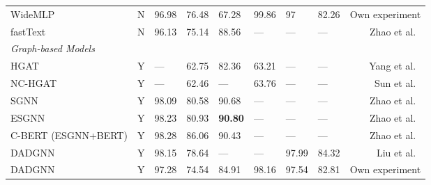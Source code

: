 \documentclass[runningheads]{llncs}
\begin{document}
\begin{table*}[!ht]
\begin{threeparttable}
{\begin{tabular}{lcllllllr}
            WideMLP                                 & N                   & 96.98            & 76.48          & 67.28                             & 99.86            & 97            & 82.26          & Own experiment                  \\
            fastText                                & N                   & 96.13            & 75.14          & 88.56\tnote{$4$}          & ---              & ---           & ---            & Zhao et al.~\cite{zhao2021sequential}      \\
            \midrule
            \textit{Graph-based Models} \\
            HGAT\tnote{$2$}                         & Y                   & ---              & 62.75          & 82.36                             & 63.21            & ---           & ---            & Yang et al.~\cite{hgat}                    \\
            NC-HGAT\tnote{$2$}                      & Y                   & ---              & 62.46          & ---                               & 63.76            & ---           & ---            & Sun et al.~\cite{nc-hgat}                 \\
            SGNN\tnote{$3$}                         & Y                   & 98.09            & 80.58          & 90.68\tnote{$4$}                  & ---              & ---           & ---            & Zhao et al.~\cite{zhao2021sequential}      \\
            ESGNN\tnote{$3$}                        & Y                   & 98.23            & 80.93          & \textbf{90.80}\tnote{$4$}         & ---              & ---           & ---            & Zhao et al.~\cite{zhao2021sequential}      \\
            C-BERT (ESGNN+BERT)\tnote{$3$}        & Y                   & 98.28            & 86.06          & 90.43\tnote{$4$}                  & ---              & ---           & ---            & Zhao et al.~\cite{zhao2021sequential}      \\
            DADGNN                                  & Y                   & 98.15            & 78.64          & ---                               & ---              & 97.99         & 84.32          & Liu et al.~\cite{liu2021deep}             \\
            DADGNN                                  & Y                   & 97.28            & 74.54          & 84.91                             & 98.16            & 97.54         & 82.81          & Own experiment                  \\

\end{tabular}}
\end{threeparttable}
\end{table*}
\end{document}
